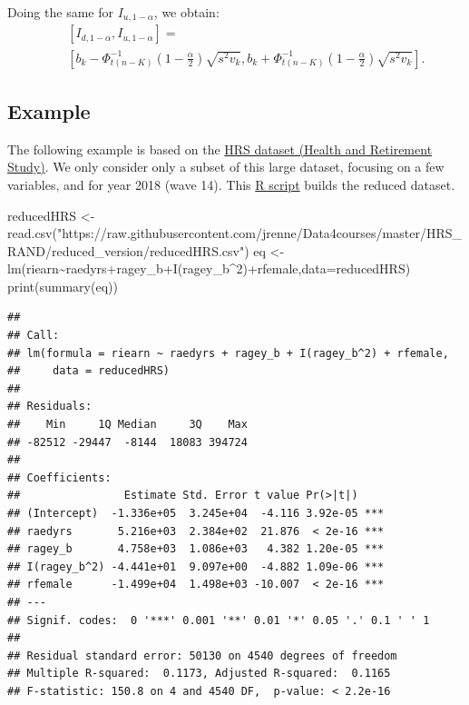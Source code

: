 \documentclass[
]{book}
\newenvironment{Shaded}{\begin{snugshade}}{\end{snugshade}}
\newcommand{\AttributeTok}[1]{\textcolor[rgb]{0.77,0.63,0.00}{#1}}
\newcommand{\DecValTok}[1]{\textcolor[rgb]{0.00,0.00,0.81}{#1}}
\newcommand{\FunctionTok}[1]{\textcolor[rgb]{0.00,0.00,0.00}{#1}}
\newcommand{\NormalTok}[1]{#1}
\newcommand{\OtherTok}[1]{\textcolor[rgb]{0.56,0.35,0.01}{#1}}
\newcommand{\SpecialCharTok}[1]{\textcolor[rgb]{0.00,0.00,0.00}{#1}}
\newcommand{\StringTok}[1]{\textcolor[rgb]{0.31,0.60,0.02}{#1}}
\theoremstyle{definition}
\theoremstyle{definition}
\theoremstyle{definition}
\theoremstyle{definition}
\theoremstyle{remark}
\begin{document}
Doing the same for \(I_{u,1-\alpha}\), we obtain:
\begin{eqnarray*}
&&[I_{d,1-\alpha},I_{u,1-\alpha}] =\\
&&\left[b_k - \Phi^{-1}_{t(n-K)}\left(1-\frac{\alpha}{2}\right)\sqrt{s^2v_k},b_k + \Phi^{-1}_{t(n-K)}\left(1-\frac{\alpha}{2}\right)\sqrt{s^2v_k}\right].
\end{eqnarray*}

\hypertarget{example}{%
\subsection{Example}\label{example}}

The following example is based on the \href{https://hrs.isr.umich.edu/about}{HRS dataset (Health and Retirement Study)}. We only consider only a subset of this large dataset, focusing on a few variables, and for year 2018 (wave 14). This \href{https://raw.githubusercontent.com/jrenne/Data4courses/master/HRS_RAND/reduced_version/prepare_small_HRS.R}{R script} builds the reduced dataset.

\begin{Shaded}
\begin{Highlighting}[]
\NormalTok{reducedHRS }\OtherTok{\textless{}{-}} \FunctionTok{read.csv}\NormalTok{(}\StringTok{"https://raw.githubusercontent.com/jrenne/Data4courses/master/HRS\_RAND/reduced\_version/reducedHRS.csv"}\NormalTok{)}
\NormalTok{eq }\OtherTok{\textless{}{-}} \FunctionTok{lm}\NormalTok{(riearn}\SpecialCharTok{\textasciitilde{}}\NormalTok{raedyrs}\SpecialCharTok{+}\NormalTok{ragey\_b}\SpecialCharTok{+}\FunctionTok{I}\NormalTok{(ragey\_b}\SpecialCharTok{\^{}}\DecValTok{2}\NormalTok{)}\SpecialCharTok{+}\NormalTok{rfemale,}\AttributeTok{data=}\NormalTok{reducedHRS)}
\FunctionTok{print}\NormalTok{(}\FunctionTok{summary}\NormalTok{(eq))}
\end{Highlighting}
\end{Shaded}

\begin{verbatim}
## 
## Call:
## lm(formula = riearn ~ raedyrs + ragey_b + I(ragey_b^2) + rfemale, 
##     data = reducedHRS)
## 
## Residuals:
##    Min     1Q Median     3Q    Max 
## -82512 -29447  -8144  18083 394724 
## 
## Coefficients:
##                Estimate Std. Error t value Pr(>|t|)    
## (Intercept)  -1.336e+05  3.245e+04  -4.116 3.92e-05 ***
## raedyrs       5.216e+03  2.384e+02  21.876  < 2e-16 ***
## ragey_b       4.758e+03  1.086e+03   4.382 1.20e-05 ***
## I(ragey_b^2) -4.441e+01  9.097e+00  -4.882 1.09e-06 ***
## rfemale      -1.499e+04  1.498e+03 -10.007  < 2e-16 ***
## ---
## Signif. codes:  0 '***' 0.001 '**' 0.01 '*' 0.05 '.' 0.1 ' ' 1
## 
## Residual standard error: 50130 on 4540 degrees of freedom
## Multiple R-squared:  0.1173, Adjusted R-squared:  0.1165 
## F-statistic: 150.8 on 4 and 4540 DF,  p-value: < 2.2e-16
\end{verbatim}
\end{document}
